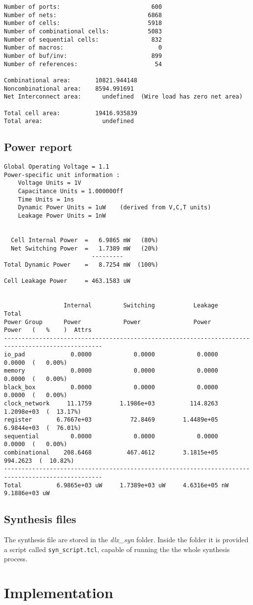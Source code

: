 \begin{verbatim}
Number of ports:                          600
Number of nets:                          6868
Number of cells:                         5918
Number of combinational cells:           5083
Number of sequential cells:               832
Number of macros:                           0
Number of buf/inv:                        899
Number of references:                      54

Combinational area:       10821.944148
Noncombinational area:    8594.991691
Net Interconnect area:      undefined  (Wire load has zero net area)

Total cell area:          19416.935839
Total area:                 undefined
\end{verbatim}

\subsection{Power report}

\begin{verbatim}
Global Operating Voltage = 1.1  
Power-specific unit information :
    Voltage Units = 1V
    Capacitance Units = 1.000000ff
    Time Units = 1ns
    Dynamic Power Units = 1uW    (derived from V,C,T units)
    Leakage Power Units = 1nW


  Cell Internal Power  =   6.9865 mW   (80%)
  Net Switching Power  =   1.7389 mW   (20%)
                         ---------
Total Dynamic Power    =   8.7254 mW  (100%)

Cell Leakage Power     = 463.1583 uW


                 Internal         Switching           Leakage            Total
Power Group      Power            Power               Power              Power   (   %    )  Attrs
--------------------------------------------------------------------------------------------------
io_pad             0.0000            0.0000            0.0000            0.0000  (   0.00%)
memory             0.0000            0.0000            0.0000            0.0000  (   0.00%)
black_box          0.0000            0.0000            0.0000            0.0000  (   0.00%)
clock_network     11.1759        1.1986e+03          114.8263        1.2098e+03  (  13.17%)
register       6.7667e+03           72.8469        1.4489e+05        6.9844e+03  (  76.01%)
sequential         0.0000            0.0000            0.0000            0.0000  (   0.00%)
combinational    208.6468          467.4612        3.1815e+05          994.2623  (  10.82%)
--------------------------------------------------------------------------------------------------
Total          6.9865e+03 uW     1.7389e+03 uW     4.6316e+05 nW     9.1886e+03 uW
\end{verbatim}

\subsection{Synthesis files}

The synthesis file are stored in the {\it dlx\_syn} folder. Inside the folder it is provided a script called
\verb|syn_script.tcl|, capable of running the the whole synthesis process.

\section{Implementation}